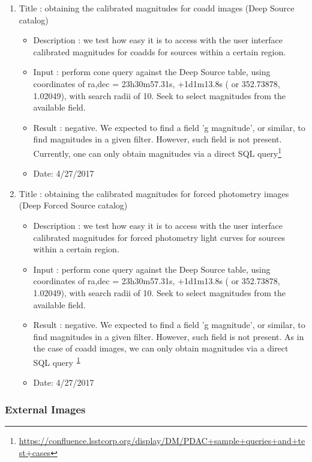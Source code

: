 \documentclass[DM,lsstdraft,toc]{lsstdoc}
\begin{document}
\begin{enumerate}
    \item Title : obtaining the calibrated magnitudes for coadd images (Deep Source catalog)
    \begin{itemize}
      \item Description : we test how easy it is to access with the user interface calibrated magnitudes for coadds  for sources  within a certain region.
      \item Input : perform cone query against the Deep Source table, using coordinates of ra,dec = 23h30m57.31s, +1d1m13.8s  ( or 352.73878\degree ,  1.02049\degree ), with search radii of 10\arcsec.  Seek to select magnitudes from the available field.
      \item Result : negative.  We expected to find a field 'g magnitude', or similar, to find magnitudes in a given filter.  However, such field is not present. Currently, one can only obtain magnitudes via a direct SQL query\footnote{\url{https://confluence.lsstcorp.org/display/DM/PDAC+sample+queries+and+test+cases}\label{note2}}
      \item Date: 4/27/2017
    \end{itemize}

     \item Title : obtaining the calibrated magnitudes for forced photometry images (Deep Forced Source catalog)
    \begin{itemize}
      \item Description : we test how easy it is to access with the user interface calibrated magnitudes for forced photometry light curves  for sources  within a certain region.
      \item Input : perform cone query against the Deep Source table, using coordinates of ra,dec = 23h30m57.31s, +1d1m13.8s  ( or 352.73878\degree ,  1.02049\degree ), with search radii of 10\arcsec.  Seek to select magnitudes from the available field.
      \item Result : negative. We expected to find a field 'g magnitude', or similar, to find magnitudes in a given filter.  However, such field is not present. As in the case of coadd images,  we can only obtain magnitudes via a direct SQL query\textsuperscript{~\ref{note2}}
      \item Date: 4/27/2017
    \end{itemize}
\end{enumerate}

\subsubsection{External Images}
\label{sec:ext_images}
\end{document}
